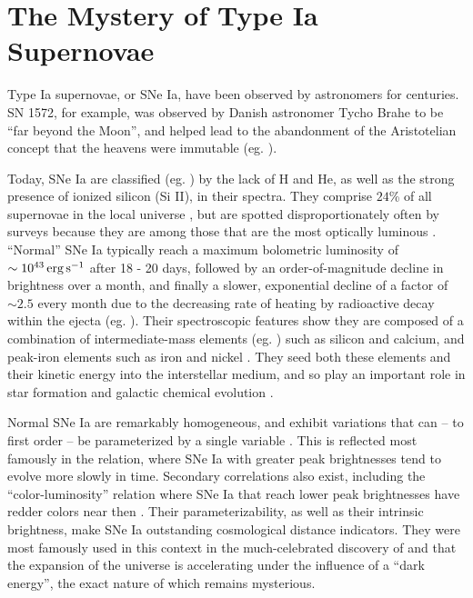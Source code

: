 \section{The Mystery of Type Ia Supernovae}
\label{sec:c1_mysteryofsneia}


Type Ia supernovae, or SNe Ia, have been observed by astronomers for centuries.  SN 1572, for example, was observed by Danish astronomer Tycho Brahe to be ``far beyond the Moon'', and helped lead to the abandonment of the Aristotelian concept that the heavens were immutable (eg. \citealt{clars77}).


Today, SNe Ia are classified (eg. \citealt{fili97, li+11}) by the lack of H and He, as well as the strong presence of ionized silicon (Si II), in their spectra.  They comprise $24$\% of all supernovae in the local universe \citep{li+11}, but are spotted disproportionately often by surveys because they are among those that are the most optically luminous \citep{howe11}.  ``Normal'' SNe Ia \citep{bran98, bran+06} typically reach a maximum bolometric luminosity of $\sim10^{43}\,\ergpsec$ after 18 - 20 days, followed by an order-of-magnitude decline in brightness over a month, and finally a slower, exponential decline of a factor of $\sim2.5$ every month due to the decreasing rate of heating by radioactive decay within the ejecta (eg. \citealt{fili97, hill+13}).  Their spectroscopic features show they are composed of a combination of intermediate-mass elements (eg. \citealt{arne96}) such as silicon and calcium, and peak-iron elements such as iron and nickel \citep{fili97}.  They seed both these elements and their kinetic energy into the interstellar medium, and so play an important role in star formation and galactic chemical evolution \citep{maozmn14}.


Normal SNe Ia are remarkably homogeneous, and exhibit variations that can -- to first order -- be parameterized by a single variable \citep{hilln00, howe11}.  This is reflected most famously in the \cite{phil93} relation, where SNe Ia with greater peak brightnesses tend to evolve more slowly in time.  Secondary correlations also exist, including the ``color-luminosity'' relation where SNe Ia that reach lower peak brightnesses have redder colors near then \citep{ries+96}.  Their parameterizability, as well as their intrinsic brightness, make SNe Ia outstanding cosmological distance indicators.  They were most famously used in this context in the much-celebrated discovery of \citep{ries+98} and \cite{perl+99} that the expansion of the universe is accelerating under the influence of a ``dark energy'', the exact nature of which remains mysterious.

